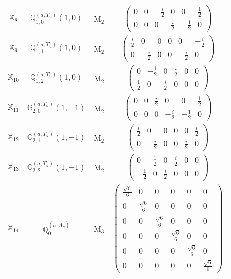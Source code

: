\documentclass[fleqn,10pt,landscape]{article}
\begin{document}
\begin{itemize}
\begin{center}
\begin{longtable}{c|c|c|c}
$ \mathbb{X}_{8} $ & $\mathbb{Q}_{1,0}^{(a,T_{u})}(1,0)$ & M$_{2}$ & $\begin{pmatrix} 0 & 0 & - \frac{i}{2} & 0 & 0 & \frac{1}{2} \\ 0 & 0 & 0 & \frac{i}{2} & - \frac{1}{2} & 0 \end{pmatrix}$ \\
$ \mathbb{X}_{9} $ & $\mathbb{Q}_{1,1}^{(a,T_{u})}(1,0)$ & M$_{2}$ & $\begin{pmatrix} \frac{i}{2} & 0 & 0 & 0 & 0 & - \frac{i}{2} \\ 0 & - \frac{i}{2} & 0 & 0 & - \frac{i}{2} & 0 \end{pmatrix}$ \\
$ \mathbb{X}_{10} $ & $\mathbb{Q}_{1,2}^{(a,T_{u})}(1,0)$ & M$_{2}$ & $\begin{pmatrix} 0 & - \frac{1}{2} & 0 & \frac{i}{2} & 0 & 0 \\ \frac{1}{2} & 0 & \frac{i}{2} & 0 & 0 & 0 \end{pmatrix}$ \\
$ \mathbb{X}_{11} $ & $\mathbb{G}_{2,0}^{(a,T_{u})}(1,-1)$ & M$_{2}$ & $\begin{pmatrix} 0 & 0 & \frac{i}{2} & 0 & 0 & \frac{1}{2} \\ 0 & 0 & 0 & - \frac{i}{2} & - \frac{1}{2} & 0 \end{pmatrix}$ \\
$ \mathbb{X}_{12} $ & $\mathbb{G}_{2,1}^{(a,T_{u})}(1,-1)$ & M$_{2}$ & $\begin{pmatrix} \frac{i}{2} & 0 & 0 & 0 & 0 & \frac{i}{2} \\ 0 & - \frac{i}{2} & 0 & 0 & \frac{i}{2} & 0 \end{pmatrix}$ \\
$ \mathbb{X}_{13} $ & $\mathbb{G}_{2,2}^{(a,T_{u})}(1,-1)$ & M$_{2}$ & $\begin{pmatrix} 0 & \frac{1}{2} & 0 & \frac{i}{2} & 0 & 0 \\ - \frac{1}{2} & 0 & \frac{i}{2} & 0 & 0 & 0 \end{pmatrix}$ \\ \hline
$ \mathbb{X}_{14} $ & $\mathbb{Q}_{0}^{(a,A_{g})}$ & M$_{3}$ & $\begin{pmatrix} \frac{\sqrt{6}}{6} & 0 & 0 & 0 & 0 & 0 \\ 0 & \frac{\sqrt{6}}{6} & 0 & 0 & 0 & 0 \\ 0 & 0 & \frac{\sqrt{6}}{6} & 0 & 0 & 0 \\ 0 & 0 & 0 & \frac{\sqrt{6}}{6} & 0 & 0 \\ 0 & 0 & 0 & 0 & \frac{\sqrt{6}}{6} & 0 \\ 0 & 0 & 0 & 0 & 0 & \frac{\sqrt{6}}{6} \end{pmatrix}$ \\

\end{longtable}
\end{center}
\end{itemize}
\end{document}
